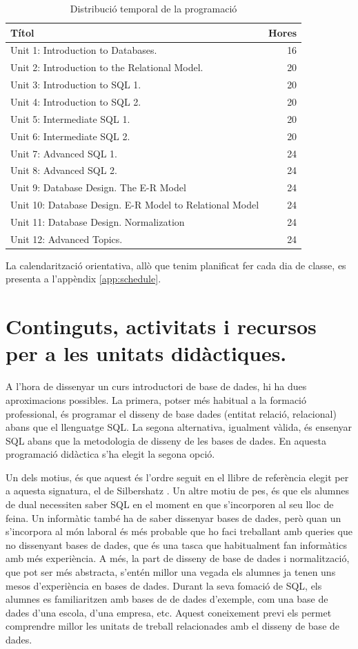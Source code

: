 \documentclass[catalan, a4paper, 12pt, titlepage]{article}
\begin{document}
\begin{table}
	\centering
\begin{tabular}{lr}
 Títol & Hores\\
 \hline
 Unit 1: Introduction to Databases. & 16\\
 Unit 2: Introduction to the Relational Model. & 20  \\
 Unit 3: Introduction to SQL 1. & 20\\
 Unit 4: Introduction to SQL 2. & 20 \\
 Unit 5: Intermediate SQL 1. & 20 \\
 Unit 6: Intermediate SQL 2. & 20 \\
 Unit 7: Advanced SQL 1. & 24 \\
 Unit 8: Advanced SQL 2. & 24\\
 Unit 9: Database Design. The E-R Model & 24\\
 Unit 10: Database Design. E-R Model to Relational Model & 24 \\
 Unit 11: Database Design. Normalization & 24 \\
 Unit 12: Advanced Topics. & 24 \\
\end{tabular}
	\caption{Distribució temporal de la programació} \label{tab:distribuciotemporal}
\end{table}

La calendarització orientativa, allò que tenim planificat fer cada dia de classe, es presenta a l'appèndix \ref{app:schedule}.

\section{Continguts, activitats i recursos per a les unitats didàctiques.}
\label{sec:unitats}

A l'hora de dissenyar un curs introductori de base de dades, hi ha dues aproximacions possibles.
La primera, potser més habitual a la formació professional, és programar el disseny de base dades (entitat relació, relacional) abans que el llenguatge SQL.
La segona alternativa, igualment vàlida, és ensenyar SQL abans que la metodologia de disseny de les bases de dades.
En aquesta programació didàctica s'ha elegit la segona opció.

Un dels motius, és que aquest és l'ordre seguit en el llibre de referència elegit per a aquesta signatura, el de Silbershatz \cite{silbershatz2020}.
Un altre motiu de pes, és que els alumnes de dual necessiten saber SQL en el moment en que s'incorporen al seu lloc de feina.
Un informàtic també ha de saber dissenyar bases de dades, però quan un s'incorpora al món laboral és més probable que ho faci treballant amb queries que no dissenyant bases de dades, que és una tasca que habitualment fan informàtics amb més experiència.
A més, la part de disseny de base de dades i normalització, que pot ser més abstracta, s'entén millor una vegada els alumnes ja tenen uns mesos d'experiència en bases de dades.
Durant la seva fomació de SQL, els alumnes es familiaritzen amb bases de de dades d'exemple, com una base de dades d'una escola, d'una empresa, etc.
Aquest coneixement previ els permet comprendre millor les unitats de treball relacionades amb el disseny de base de dades.
\end{document}
